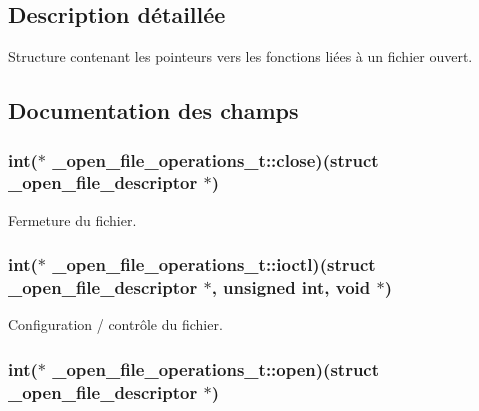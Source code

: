 \subsection{Description détaillée}
Structure contenant les pointeurs vers les fonctions liées à un fichier ouvert. 

\subsection{Documentation des champs}
\hypertarget{struct__open__file__operations__t_a187ebd3d665fde0a486bd7f5d3001f00}{
\subsubsection[{close}]{\setlength{\rightskip}{0pt plus 5cm}int($\ast$ \+\_\+open\+\_\+file\+\_\+operations\+\_\+t\+::close)(struct {\bf \+\_\+open\+\_\+file\+\_\+descriptor} $\ast$)}}\label{struct__open__file__operations__t_a187ebd3d665fde0a486bd7f5d3001f00}
Fermeture du fichier. \hypertarget{struct__open__file__operations__t_ab71efab6158837196ad4fef57565dddc}{
\subsubsection[{ioctl}]{\setlength{\rightskip}{0pt plus 5cm}int($\ast$ \+\_\+open\+\_\+file\+\_\+operations\+\_\+t\+::ioctl)(struct {\bf \+\_\+open\+\_\+file\+\_\+descriptor} $\ast$, unsigned int, void $\ast$)}}\label{struct__open__file__operations__t_ab71efab6158837196ad4fef57565dddc}
Configuration / contrôle du fichier. \hypertarget{struct__open__file__operations__t_a22018bcaef028f486c45838ba983c170}{
\subsubsection[{open}]{\setlength{\rightskip}{0pt plus 5cm}int($\ast$ \+\_\+open\+\_\+file\+\_\+operations\+\_\+t\+::open)(struct {\bf \+\_\+open\+\_\+file\+\_\+descriptor} $\ast$)}}\label{struct__open__file__operations__t_a22018bcaef028f486c45838ba983c170}
